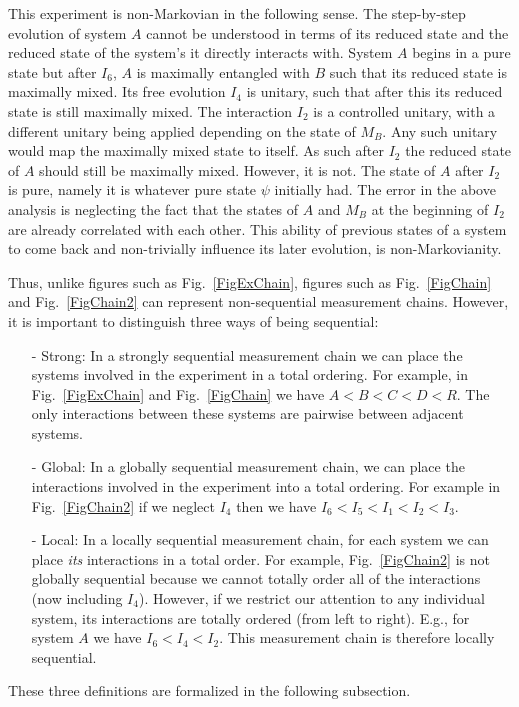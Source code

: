 \documentclass[12pt,prd,superscriptaddress,floatfix,amsmath,amssymb,amsfonts,nofootinbib]{revtex4-2}
\begin{document}
This experiment is non-Markovian in the following sense. The step-by-step evolution of system $A$ cannot be understood in terms of its reduced state and the reduced state of the system's it directly interacts with. System $A$ begins in a pure state but after $I_6$, $A$ is maximally entangled with $B$ such that its reduced state is maximally mixed. Its free evolution $I_4$ is unitary, such that after this its reduced state is still maximally mixed. The interaction $I_2$ is a controlled unitary, with a different unitary being applied depending on the state of $M_B$. Any such unitary would map the maximally mixed state to itself. As such after $I_2$ the reduced state of $A$ should still be maximally mixed. However, it is not. The state of $A$ after $I_2$ is pure, namely it is whatever pure state $\psi$ initially had. The error in the above analysis is neglecting the fact that the states of $A$ and $M_B$ at the beginning of $I_2$ are already correlated with each other. This ability of previous states of a system to come back and non-trivially influence its later evolution, is non-Markovianity.

Thus, unlike figures such as Fig.~\ref{FigExChain},  figures such as Fig.~\ref{FigChain} and Fig.~\ref{FigChain2} can represent non-sequential measurement chains. However, it is important to distinguish three ways of being sequential:
\begin{itemize}
    \item[-] Strong: In a strongly sequential measurement chain we can place the systems involved in the experiment in a total ordering. For example, in Fig.~\ref{FigExChain} and Fig.~\ref{FigChain} we have  \mbox{$A < B < C < D < R$}. The only interactions between these systems are pairwise between adjacent systems. 
    \item[-] Global: In a globally sequential measurement chain, we can place the interactions involved in the experiment into a total ordering. For example in Fig.~\ref{FigChain2} if we neglect $I_4$ then we have \mbox{$I_6 < I_5 < I_1 < I_2 < I_3$}.
    \item[-] Local: In a locally sequential measurement chain, for each system we can place \textit{its} interactions in a total order. For example, Fig.~\ref{FigChain2} is not globally sequential because we cannot totally order all of the interactions (now including $I_4$). However, if we restrict our attention to any individual system, its interactions are totally ordered (from left to right). E.g., for system $A$ we have \mbox{$I_6 < I_4 < I_2$}. This measurement chain is therefore locally sequential.
\end{itemize}
These three definitions are formalized in the following subsection.
\end{document}
